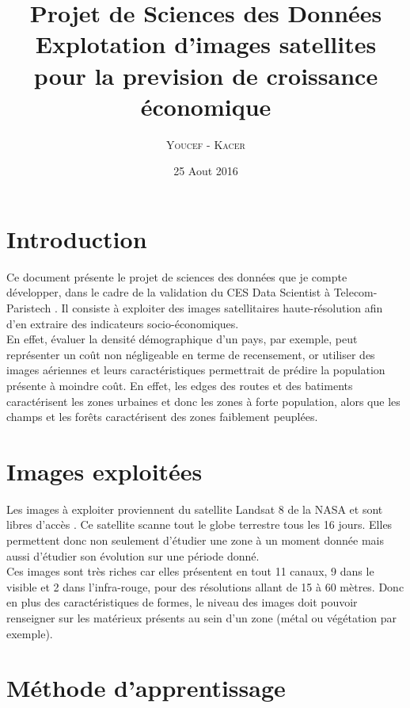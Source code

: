 \documentclass{book}
\title{%
  Projet de Sciences des Données \\
  \large Explotation d'images satellites pour la prevision de croissance économique \\
    }
\author{\textsc{Youcef} - \textsc{Kacer}}
\date{25 Aout 2016}
\begin{document}
 
\maketitle

\tableofcontents

\frontmatter
\chapter{Introduction}
Ce document présente le projet de sciences des données que je compte développer, dans le cadre de la validation du CES Data Scientist à Telecom-Paristech \cite{cesds}.
Il consiste à exploiter des images satellitaires haute-résolution afin d'en extraire des indicateurs socio-économiques.\\
En effet, évaluer la densité démographique d'un pays, par exemple, peut représenter un co\^{u}t non négligeable en terme de 
recensement, or utiliser des images aériennes et leurs caractéristiques permettrait de prédire la population présente à moindre co\^{u}t.
En effet, les \og edges \fg des routes et des batiments caractérisent les zones urbaines et donc les zones à forte population, alors que
les champs et les for\^{e}ts caractérisent des zones faiblement peuplées.\\

\mainmatter
\chapter{Images exploitées}

Les images à exploiter proviennent du satellite Landsat 8 de la NASA et sont libres d'accès \cite{landsat8}. Ce satellite scanne tout le globe terrestre 
tous les 16 jours. Elles permettent donc non seulement d'étudier une zone à un moment donnée mais aussi d'étudier son évolution sur
une période donné.\\
Ces images sont très riches car elles présentent en tout 11 canaux, 9 dans le visible et 2 dans l'infra-rouge, pour des résolutions 
allant de 15 à 60 mètres. Donc en plus des caractéristiques de formes, le niveau des images doit pouvoir renseigner sur 
les matérieux présents au sein d'un zone (métal ou végétation par exemple).\\

\chapter{Méthode d'apprentissage}
\end{document}
